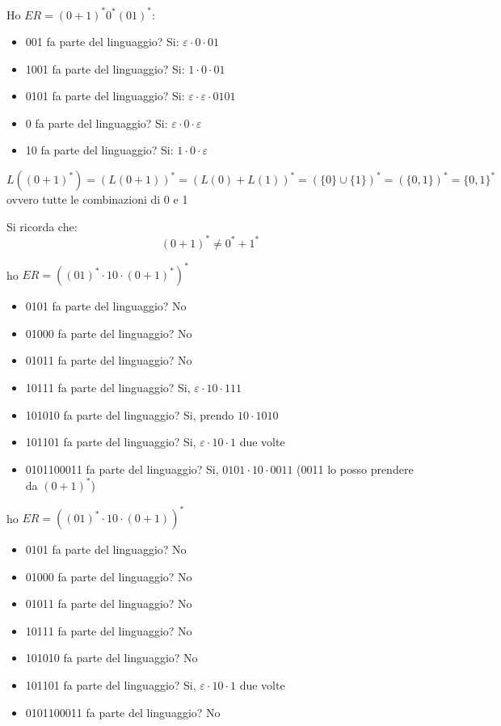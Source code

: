 	\begin{example}
	Ho $ER=(0+1)^*0^*(01)^*$:
	\begin{itemize}
		\item 001 fa parte del linguaggio? Si: $\varepsilon\cdot 0\cdot 01$
		\item 1001 fa parte del linguaggio? Si: $1\cdot 0\cdot 01$
		\item 0101 fa parte del linguaggio? Si: $\varepsilon\cdot\varepsilon \cdot 0101$
		\item 0 fa parte del linguaggio? Si: $\varepsilon\cdot 0\cdot \varepsilon$
		\item 10 fa parte del linguaggio? Si: $1\cdot 0\cdot \varepsilon$
	\end{itemize}
	$$L((0+1)^*)=(L(0+1))^*=(L(0)+L(1))^*=(\{0\}\cup \{1\})^*=(\{0,1\})^*=\{0,1\}^*$$
	ovvero tutte le combinazioni di 0 e 1
\end{example}
Si ricorda che:
$$(0+1)^*\neq 0^*+1^*$$
\newpage
\begin{example}
	ho $ER=((01)^*\cdot 10\cdot (0+1)^*)^*$
	\begin{itemize}
		\item 0101 fa parte del linguaggio? No
		\item 01000 fa parte del linguaggio? No
		\item 01011 fa parte del linguaggio? No
		\item 10111 fa parte del linguaggio? Si, $\varepsilon\cdot 10\cdot 111$
		\item 101010 fa parte del linguaggio? Si, prendo $10\cdot 1010$
		\item 101101 fa parte del linguaggio? Si, $\varepsilon\cdot 10\cdot 1$ due volte
		\item 0101100011 fa parte del linguaggio? Si, $0101\cdot 10\cdot 0011$ (0011 lo posso prendere da $(0+1)^*$)
	\end{itemize}
\end{example}
\begin{example}
	ho $ER=((01)^*\cdot 10\cdot (0+1))^*$
	\begin{itemize}
		\item 0101 fa parte del linguaggio? No
		\item 01000 fa parte del linguaggio? No
		\item 01011 fa parte del linguaggio? No
		\item 10111 fa parte del linguaggio? No
		\item 101010 fa parte del linguaggio? No
		\item 101101 fa parte del linguaggio? Si, $\varepsilon\cdot 10\cdot 1$ due volte
		\item 0101100011 fa parte del linguaggio? No
	\end{itemize}
\end{example}
